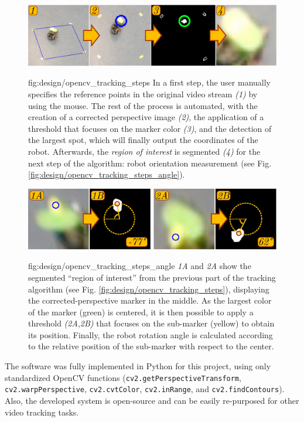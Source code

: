 \begin{figure}[h!]
\centerline{\mbox{\includegraphics[width=15cm]{images/design/opencv_tracking_steps.eps}}}
{fig:design/opencv_tracking_steps}{
In a first step, the user manually specifies the reference points in the original video stream \emph{(1)} by using the mouse. The rest of the process is automated, with the creation of a corrected perspective image \emph{(2)}, the application of a threshold that focuses on the marker color \emph{(3)}, and the detection of the largest spot, which will finally output the coordinates of the robot. Afterwards, the \emph{region of interest} is segmented \emph{(4)} for the next step of the algorithm: robot orientation measurement (see Fig. \ref{fig:design/opencv_tracking_steps_angle}).
}\end{figure}




\begin{figure}[h!]
\centerline{\mbox{\includegraphics[width=15cm]{images/design/opencv_tracking_steps_angle.eps}}}
{fig:design/opencv_tracking_steps_angle}{
\emph{1A} and \emph{2A} show the segmented ``region of interest'' from the previous part of the tracking algorithm (see Fig. \ref{fig:design/opencv_tracking_steps}), displaying the corrected-perspective marker in the middle. As the largest color of the marker (green) is centered, it is then possible to apply a threshold \emph{(2A},\emph{2B)} that focuses on the sub-marker (yellow) to obtain its position. Finally, the robot rotation angle is calculated according to the relative position of the sub-marker with respect to the center.
}\end{figure}


The software was fully implemented in Python for this project, using only standardized OpenCV functions (\texttt{cv2.getPerspectiveTransform}, \texttt{cv2.warpPerspective}, \texttt{cv2.cvtColor}, \texttt{cv2.inRange}, and \texttt{cv2.findContours}).
Also, the developed system is open-source and can be easily re-purposed for other video tracking tasks.



